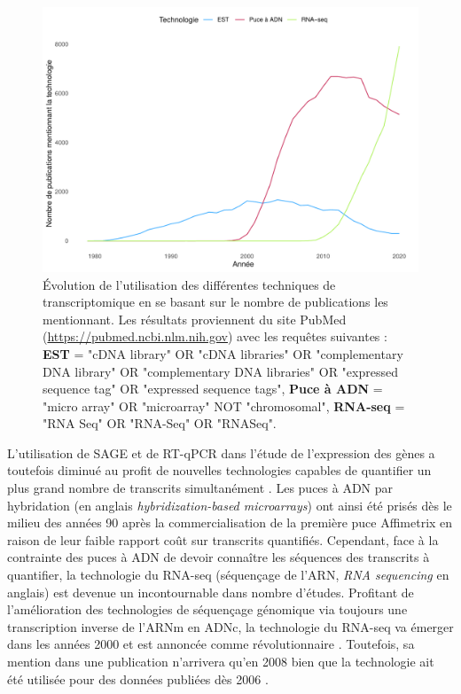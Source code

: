 \begin{figure}[!ht]
    \centering
    \includegraphics[width=\textwidth]{img/intro/2_meth_transcripto/intro_2_count_by_year_rnaseq_microarray_est.pdf}
    \caption[Évolution de l'utilisation des différentes techniques de transcriptomique en se basant sur le nombre de publications les mentionnant]{Évolution de l'utilisation des différentes techniques de transcriptomique en se basant sur le nombre de publications les mentionnant. Les résultats proviennent du site PubMed (\url{https://pubmed.ncbi.nlm.nih.gov}) avec les requêtes suivantes : \textbf{EST} = "cDNA library" OR "cDNA libraries" OR "complementary DNA library" OR "complementary DNA libraries" OR "expressed sequence tag" OR "expressed sequence tags", \textbf{Puce à ADN} = "micro array" OR "microarray" NOT "chromosomal", \textbf{RNA-seq} = "RNA Seq" OR "RNA-Seq" OR "RNASeq".}
    \label{fig:count_by_year_rnaseq_microarray_est}
\end{figure}


L'utilisation de SAGE et de RT-qPCR dans l'étude de l'expression des gènes a toutefois diminué au profit de nouvelles technologies capables de quantifier un plus grand nombre de transcrits simultanément \cite{Lowe2017May}. Les puces à ADN par hybridation (en anglais \textit{hybridization-based microarrays}) ont ainsi été prisés dès le milieu des années 90 \cite{Schena1995Oct} après la commercialisation de la première puce Affimetrix \cite{Lenoir2006} en raison de leur faible rapport coût sur transcrits quantifiés. Cependant, face à la contrainte des puces à ADN de devoir connaître les séquences des transcrits à quantifier, la technologie du RNA-seq  (séquençage de l'ARN, \textit{RNA sequencing} en anglais) est devenue un incontournable dans nombre d'études. 
Profitant de l'amélioration des technologies de séquençage génomique via toujours une transcription inverse de l'ARNm en ADNc, la technologie du RNA-seq va émerger dans les années 2000 et est annoncée comme révolutionnaire \cite{Wang2009Jan}. Toutefois, sa mention dans une publication n'arrivera qu'en 2008 \cite{Nagalakshmi2008Jun} bien que la technologie ait été utilisée pour des données publiées dès 2006 \cite{Cheung2006Dec}.

